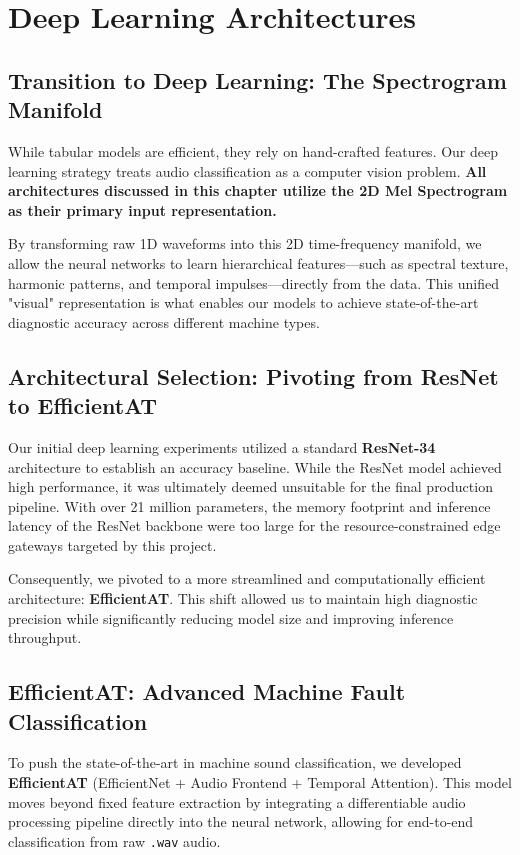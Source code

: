\chapter{Deep Learning Architectures}

\section{Transition to Deep Learning: The Spectrogram Manifold}
While tabular models are efficient, they rely on hand-crafted features. Our deep learning strategy treats audio classification as a computer vision problem. \textbf{All architectures discussed in this chapter utilize the 2D Mel Spectrogram as their primary input representation.} 

By transforming raw 1D waveforms into this 2D time-frequency manifold, we allow the neural networks to learn hierarchical features—such as spectral texture, harmonic patterns, and temporal impulses—directly from the data. This unified "visual" representation is what enables our models to achieve state-of-the-art diagnostic accuracy across different machine types.

\section{Architectural Selection: Pivoting from ResNet to EfficientAT}
Our initial deep learning experiments utilized a standard \textbf{ResNet-34} architecture to establish an accuracy baseline. While the ResNet model achieved high performance, it was ultimately deemed unsuitable for the final production pipeline. With over 21 million parameters, the memory footprint and inference latency of the ResNet backbone were too large for the resource-constrained edge gateways targeted by this project. 

Consequently, we pivoted to a more streamlined and computationally efficient architecture: \textbf{EfficientAT}. This shift allowed us to maintain high diagnostic precision while significantly reducing model size and improving inference throughput.

\section{EfficientAT: Advanced Machine Fault Classification}
To push the state-of-the-art in machine sound classification, we developed \textbf{EfficientAT} (EfficientNet + Audio Frontend + Temporal Attention). This model moves beyond fixed feature extraction by integrating a differentiable audio processing pipeline directly into the neural network, allowing for end-to-end classification from raw \texttt{.wav} audio.

